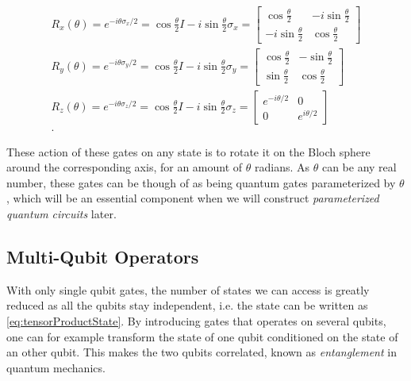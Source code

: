 \begin{equation}\label{eq:PauliRotations}
\begin{aligned}
    R_x(\theta) = e^{-i\theta\sigma_x/2} = \cos{\frac{\theta}{2}}I - i\sin{\frac{\theta}{2}}\sigma_x
    =
    \begin{bmatrix}
        \cos{\frac{\theta}{2}} & -i\sin{\frac{\theta}{2}} \\
        -i\sin{\frac{\theta}{2}} & \cos{\frac{\theta}{2}}
    \end{bmatrix}\\
    R_y(\theta) = e^{-i\theta\sigma_y/2} = \cos{\frac{\theta}{2}}I - i\sin{\frac{\theta}{2}}\sigma_y
    =
    \begin{bmatrix}
        \cos{\frac{\theta}{2}} & -\sin{\frac{\theta}{2}} \\
        \sin{\frac{\theta}{2}} & \cos{\frac{\theta}{2}}
    \end{bmatrix}\\
    R_z(\theta) = e^{-i\theta\sigma_z/2} = \cos{\frac{\theta}{2}}I - i\sin{\frac{\theta}{2}}\sigma_z
    =
    \begin{bmatrix}
        e^{-i\theta/2} & 0 \\
        0 & e^{i\theta/2}
    \end{bmatrix}\\.
\end{aligned}    
\end{equation}

These action of these gates on any state is to rotate it on the Bloch sphere around the corresponding axis, for an amount of $\theta$ radians. As $\theta$ can be any real number, these gates can be though of as being quantum gates parameterized by $\theta$, which will be an essential component when we will construct \emph{parameterized quantum circuits} later.  









\subsection{Multi-Qubit Operators}\label{sec:ControlledOperations}
With only single qubit gates, the number of states we can access is greatly reduced as all the qubits stay independent, i.e. the state can be written as \autoref{eq:tensorProductState}. By introducing gates that operates on several qubits, one can for example transform the state of one qubit conditioned on the state of an other qubit. This makes the two qubits correlated, known as \emph{entanglement} in quantum mechanics.


